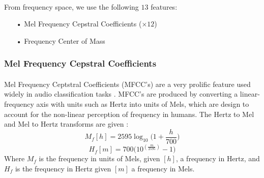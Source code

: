 \documentclass[12pt,letterpaper]{article}
\begin{document}
\paragraph*{}From frequency space, we use the following $13$ features:
\begin{itemize}
\item[•] Mel Frequency Cepstral Coefficients ($\times 12$)
\item[•] Frequency Center of Mass
\end{itemize}


\subsubsection{Mel Frequency Cepstral Coefficients}

\paragraph*{}Mel Frequency Ceptstral Coefficients (MFCC's) are a very prolific feature used widely in audio classification tasks \cite{Liu,Virtanen,Zhang}. MFCC's are produced by converting a linear-frequency axis with units such as Hertz into units of Mels, which are design to account for the non-linear perception of frequency in humans. The Hertz to Mel and Mel to Hertz transforms are given \cite{Virtanen}:
\begin{equation}
\label{eqn-HztoMel}
M_f[h] = 2595 \log_{10}\big(1+ \frac{h}{700}\big)
\end{equation}
\begin{equation}
\label{eqn-MeltoHz}
H_f[m] = 700 \big(10^{(\frac{m}{2595})}-1\big)
\end{equation}
Where $M_f$ is the frequency in units of Mels, given $[h]$, a frequency in Hertz, and $H_f$ is the frequency in Hertz given $[m]$ a frequency in Mels.
\end{document}
